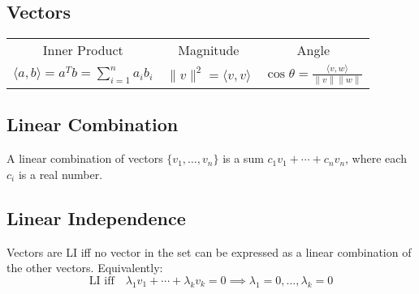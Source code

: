 \documentclass[10pt]{extarticle}
\newcommand{\R}{\mathbb{R}}
\begin{document}
\begin{multicols*}{2}

\section{Vectors}
	\noindent\begin{tabular}{ccc}
		Inner Product & Magnitude & Angle \\
		\( \displaystyle \langle a, b \rangle = a^T b = \sum_{i=1}^{n} a_i b_i \) & 
		\( \displaystyle \| v \|^2 = \langle v, v \rangle \) & 
		\( \displaystyle \cos \theta = \frac{\langle v, w \rangle}{\| v\| \| w\|} \)
	\end{tabular}

\subsection{Linear Combination}
A linear combination of vectors $\{v_1, \ldots, v_n\}$ is a sum $c_1 v_1 + \cdots + c_n v_n$, where each $c_i$ is a real number.


% 
% 

\subsection{Linear Independence}
Vectors are LI iff no vector in the set can be expressed as a linear combination of the other vectors. 
Equivalently:
\[ \text{LI iff}\quad \lambda_1 v_1 + \cdots + \lambda_k v_k = 0 \implies \lambda_1 = 0, \ldots, \lambda_k = 0 \]


\end{multicols*}
\end{document}
